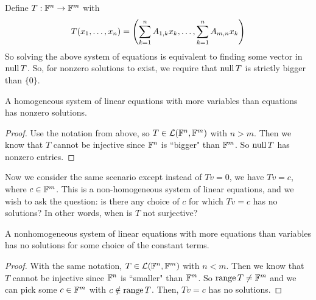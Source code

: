 Define $T: \mathbb F^n \to \mathbb F^m$ with
\[ T(x_1, \dots, x_n) = \pqty{\sum_{k=1}^n A_{1,k}x_k, \dots, \sum_{k=1}^n A_{m,n}x_k }\]
So solving the above system of equations is equivalent to finding some vector in $\operatorname{null} T$. So, for nonzero solutions to exist, we require that $\operatorname{null} T$ is strictly bigger than $\{0\}$.
\begin{theorem}
    A homogeneous system of linear equations with more variables than equations has nonzero solutions.
\end{theorem}
\begin{proof}
    Use the notation from above, so $T \in \mathcal{L}(\mathbb F^n, \mathbb F^m)$ with $n>m$. Then we know that $T$ cannot be injective since $\mathbb F^n$ is ``bigger" than $\mathbb F^m$. So $\operatorname{null} T$ has nonzero entries. 
\end{proof}
Now we consider the same scenario except instead of $Tv = 0$, we have $Tv = c$, where $c\in \mathbb F^m$. This is a non-homogeneous system of linear equations, and we wish to ask the question: is there any choice of $c$ for which $Tv = c$ has no solutions? In other words, when is $T$ not surjective?
\begin{theorem}
    A nonhomogeneous system of linear equations with more equations than variables has no solutions for some choice of the constant terms.
\end{theorem}
\begin{proof}
    With the same notation, $T\in\mathcal{L}(\mathbb F^n, \mathbb F^m)$ with $n<m$. Then we know that $T$ cannot be injective since $\mathbb F^n$ is ``smaller" than $\mathbb F^m$. So $\operatorname{range} T \ne \mathbb F^m$ and we can pick some $c\in \mathbb F^m$ with $c\notin \operatorname{range} T$. Then, $Tv = c$ has no solutions.
\end{proof}